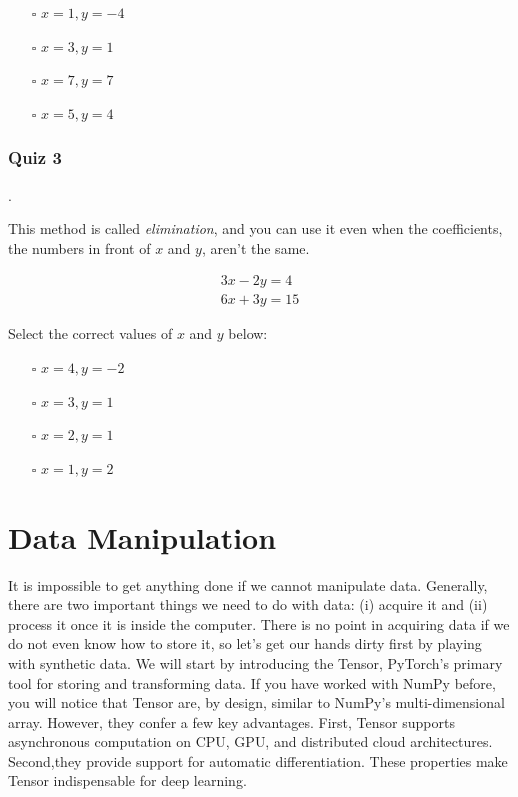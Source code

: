 \documentclass[]{article}
\begin{document}
\begin{itemize}
	\item[$\square$] $ x = 1, y = -4 $
	\item[$\square$] $ x = 3, y = 1 $
	\item[$\square$] $ x = 7, y = 7 $
	\item[$\square$] $ x = 5, y = 4 $
\end{itemize}

\subsubsection{Quiz 3}.

This method is called \textit{elimination}, and you can use it even when the coefficients, the numbers in front of $ x $ and $ y $, aren't the same.

\begin{equation} \label{}
\begin{split}
3x - 2y = 4 \\
6x + 3y = 15
\end{split}
\end{equation}

Select the correct values of $ x $ and $ y $ below:

\begin{itemize}
	\item[$\square$] $ x = 4, y = -2 $
	\item[$\square$] $ x = 3, y = 1 $
	\item[$\square$] $ x = 2, y = 1 $
	\item[$\square$] $ x = 1, y = 2 $
\end{itemize}


\section{Data Manipulation}

It is impossible to get anything done if we cannot manipulate data. Generally, there are two important things we need to do with data: (i) acquire it and (ii) process it once it is inside the computer.  There is no point in acquiring data if we do not even know how to store it, so let’s get our hands dirty first by playing with synthetic data. We will start by introducing the Tensor, PyTorch’s primary tool for storing and transforming data.  If you have worked with NumPy before, you will notice that Tensor are, by design, similar to NumPy’s multi-dimensional array.  However, they confer a few key advantages.  First, Tensor supports asynchronous computation on CPU, GPU, and distributed cloud architectures. Second,they provide support for automatic differentiation. These properties make Tensor indispensable for deep learning.
\end{document}
